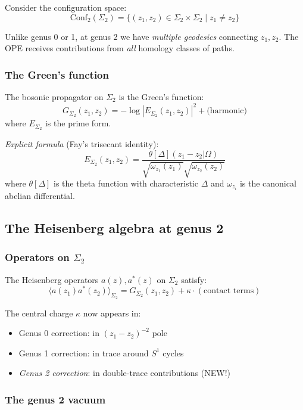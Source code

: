 Consider the configuration space:
\[\mathrm{Conf}_2(\Sigma_2) = \{(z_1, z_2) \in \Sigma_2 \times \Sigma_2 \mid z_1 \neq z_2 \}\]

Unlike genus 0 or 1, at genus 2 we have \emph{multiple geodesics} connecting $z_1, z_2$.
The OPE receives contributions from \emph{all} homology classes of paths.

\subsubsection{The Green's function}

The bosonic propagator on $\Sigma_2$ is the Green's function:
\[G_{\Sigma_2}(z_1, z_2) = -\log|E_{\Sigma_2}(z_1, z_2)|^2 + \text{(harmonic)}\]
where $E_{\Sigma_2}$ is the prime form.

\emph{Explicit formula} (Fay's trisecant identity):
\[E_{\Sigma_2}(z_1, z_2) = \frac{\theta[\Delta](z_1 - z_2 | \Omega)}
{\sqrt{\omega_{z_1}(z_1)} \sqrt{\omega_{z_2}(z_2)}}\]
where $\theta[\Delta]$ is the theta function with characteristic $\Delta$ and $\omega_{z_i}$ is the canonical abelian differential.

\subsection{The Heisenberg algebra at genus 2}

\subsubsection{\texorpdfstring{Operators on $\Sigma_2$}{Operators on -2}}

The Heisenberg operators $a(z), a^*(z)$ on $\Sigma_2$ satisfy:
\[\langle a(z_1) a^*(z_2) \rangle_{\Sigma_2} = G_{\Sigma_2}(z_1, z_2) + \kappa \cdot (\text{contact terms})\]

The central charge $\kappa$ now appears in:
\begin{itemize}
\item Genus 0 correction: in $(z_1 - z_2)^{-2}$ pole
\item Genus 1 correction: in trace around $S^1$ cycles
\item \emph{Genus 2 correction}: in double-trace contributions (NEW!)
\end{itemize}

\subsubsection{The genus 2 vacuum}

